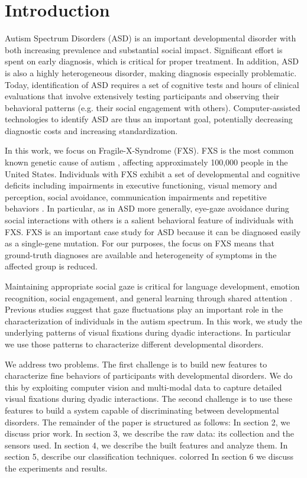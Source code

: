 \documentclass{llncs}
\begin{document}
  \section{Introduction}
  \vspace{-1em}
  Autism Spectrum Disorders (ASD) is an important developmental disorder with both increasing prevalence and substantial social impact. Significant effort is spent on early diagnosis, which is critical for proper treatment. In addition, ASD is also a highly heterogeneous disorder, making diagnosis especially problematic. Today, identification of ASD requires a set of cognitive tests and hours of clinical evaluations that involve extensively testing participants and observing their behavioral patterns (e.g. their social engagement with others). Computer-assisted technologies to identify ASD are thus an important goal, potentially decreasing diagnostic costs and increasing standardization.

  In this work, we focus on Fragile-X-Syndrome (FXS). FXS is the most common known genetic cause of autism \cite{Hagerman:2008wg}, affecting approximately 100,000 people in the United States. Individuals with FXS exhibit a set of developmental and cognitive deficits including impairments in executive functioning, visual memory and perception, social avoidance, communication impairments and repetitive behaviors \cite{Sullivan:2007gz}. In particular, as in ASD more generally, eye-gaze avoidance during social interactions with others is a salient behavioral feature of individuals with FXS. FXS is an important case study for ASD because it can be diagnosed easily as a single-gene mutation. For our purposes, the focus on FXS means that ground-truth diagnoses are available and heterogeneity of symptoms in the affected group is reduced.

  Maintaining appropriate social gaze is critical for language development, emotion recognition, social engagement, and general learning through shared attention \cite{Csibra:2006wf}. Previous studies \cite{klin2002} suggest that gaze fluctuations play an important role in the characterization of individuals in the autism spectrum. In this work, we study the underlying patterns of visual fixations during dyadic interactions. In particular we use those patterns to characterize different developmental disorders.

  We address two problems. The first challenge is to build new features to characterize fine behaviors of participants with developmental disorders. We do this by exploiting computer vision and multi-modal data to capture detailed visual fixations during dyadic interactions. The second challenge is to use these features to build a system capable of discriminating between developmental disorders. The remainder of the paper is structured as follows: In section 2, we discuss prior work. In section 3, we describe the raw data: its collection and the sensors used. In section 4, we describe the built features and analyze them. In section 5, describe our classification techniques. {color{red} In section 6 we discuss the experiments and results.}
\end{document}
